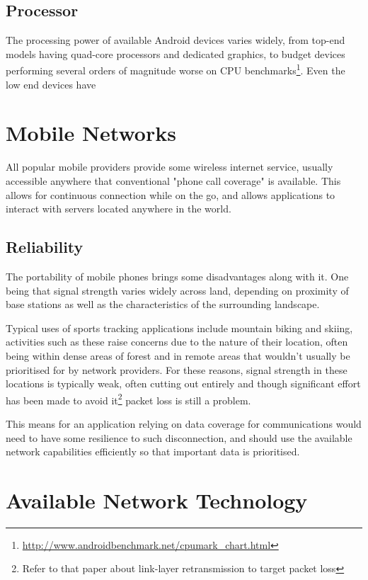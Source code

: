 \subsection{Processor}

The processing power of available Android devices varies widely, from top-end models having quad-core processors and dedicated graphics, to budget devices performing several orders of magnitude worse on CPU benchmarks\footnote{\url{http://www.androidbenchmark.net/cpumark_chart.html}}. Even the low end devices have 

\section{Mobile Networks}

All popular mobile providers provide some wireless internet service, usually accessible anywhere that conventional "phone call coverage" is available. This allows for continuous connection while on the go, and allows applications to interact with servers located anywhere in the world.

\subsection{Reliability}

The portability of mobile phones brings some disadvantages along with it. One being that signal strength varies widely across land, depending on proximity of base stations as well as the characteristics of the surrounding landscape.

Typical uses of sports tracking applications include mountain biking and skiing, activities such as these raise concerns due to the nature of their location, often being within dense areas of forest and in remote areas that wouldn't usually be prioritised for by network providers. For these reasons, signal strength in these locations is typically weak, often cutting out entirely and though significant effort has been made to avoid it\footnote{Refer to that paper about link-layer retransmission to target packet loss} packet loss is still a problem.

This means for an application relying on data coverage for communications would need to have some resilience to such disconnection, and should use the available network capabilities efficiently so that important data is prioritised.

\section{Available Network Technology}

